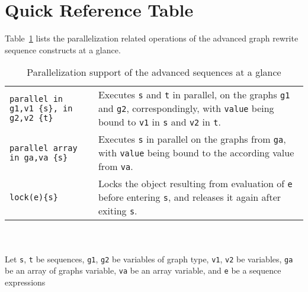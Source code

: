 \pagebreak

\section{Quick Reference Table}

Table~\ref{seqparalleltab} lists the parallelization related operations of the advanced graph rewrite sequence constructs at a glance.

\begin{table}[htbp]
\begin{minipage}{\linewidth} \renewcommand{\footnoterule}{} 
\begin{tabularx}{\linewidth}{|lX|}
\hline
\texttt{parallel in g1,v1 \{s\}, in g2,v2 \{t\}} & Executes \texttt{s} and \texttt{t} in parallel, on the graphs \texttt{g1} and \texttt{g2}, correspondingly, with \texttt{value} being bound to \texttt{v1} in \texttt{s} and \texttt{v2} in \texttt{t}.\\
\texttt{parallel array in ga,va \{s\}} & Executes \texttt{s} in parallel on the graphs from \texttt{ga}, with \texttt{value} being bound to the according value from \texttt{va}.\\
\hline
\texttt{lock(e)\{s\}} & Locks the object resulting from evaluation of \texttt{e} before entering \texttt{s}, and releases it again after exiting \texttt{s}.\\
\hline
\end{tabularx}
\end{minipage}\\
\\ 
{\small Let \texttt{s}, \texttt{t} be sequences, \texttt{g1}, \texttt{g2} be variables of graph type, \texttt{v1}, \texttt{v2} be variables, \texttt{ga} be an array of graphs variable, \texttt{va} be an array variable, and \texttt{e} be a sequence expressions}
\caption{Parallelization support of the advanced sequences at a glance}
\label{seqparalleltab}
\end{table}
 

